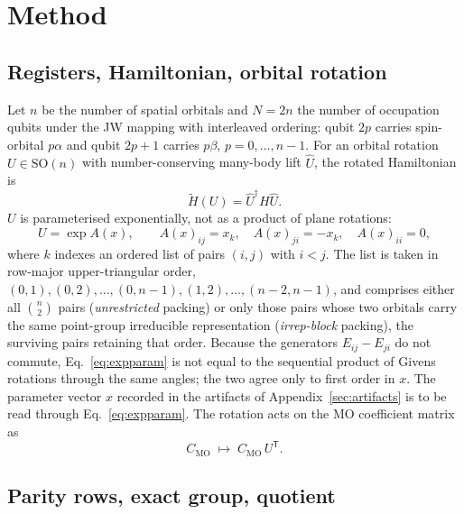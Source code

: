 \documentclass[11pt]{article}
\newcommand{\Ht}{\widetilde H}
\newcommand{\Uh}{\widehat U}
\begin{document}
\section{Method}
\label{sec:method}

\subsection{Registers, Hamiltonian, orbital rotation}

Let $n$ be the number of spatial orbitals and $N=2n$ the number of occupation
qubits under the JW mapping with interleaved ordering: qubit $2p$ carries
spin-orbital $p\alpha$ and qubit $2p+1$ carries $p\beta$, $p=0,\dots,n-1$.
For an orbital rotation $U\in\mathrm{SO}(n)$ with number-conserving many-body
lift $\Uh$, the rotated Hamiltonian is
\begin{equation}
\Ht(U)=\Uh^{\dagger}H\Uh .
\label{eq:Htilde}
\end{equation}
$U$ is parameterised exponentially, not as a product of plane rotations:
\begin{equation}
U=\exp A(x),\qquad
A(x)_{ij}=x_k,\quad A(x)_{ji}=-x_k,\quad A(x)_{ii}=0,
\label{eq:expparam}
\end{equation}
where $k$ indexes an ordered list of pairs $(i,j)$ with $i<j$. The list is
taken in row-major upper-triangular order,
$(0,1),(0,2),\dots,(0,n-1),(1,2),\dots,(n-2,n-1)$, and comprises either all
$\binom{n}{2}$ pairs (\emph{unrestricted} packing) or only those pairs whose
two orbitals carry the same point-group irreducible representation
(\emph{irrep-block} packing), the surviving pairs retaining that order. Because
the generators $E_{ij}-E_{ji}$ do not commute, Eq.~\eqref{eq:expparam} is not
equal to the sequential product of Givens rotations through the same angles;
the two agree only to first order in $x$. The parameter vector $x$ recorded in
the artifacts of Appendix~\ref{sec:artifacts} is to be read through
Eq.~\eqref{eq:expparam}.
The rotation acts on the MO coefficient matrix as
\begin{equation}
C_{\mathrm{MO}}\;\longmapsto\;C_{\mathrm{MO}}\,U^{\mathsf T}.
\label{eq:convention}
\end{equation}

\subsection{Parity rows, exact group, quotient}
\end{document}
